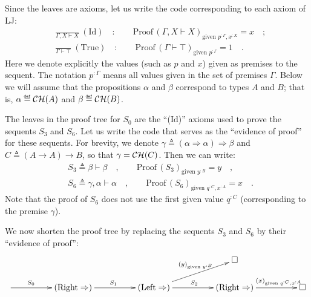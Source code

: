 Since the leaves are axioms, let us write the code corresponding to
each axiom of LJ:
\begin{align*}
 & \frac{}{\Gamma,X\vdash X}~(\text{Id})\quad:\quad\quad\text{Proof}\,(\Gamma,X\vdash X)_{\text{given }p^{:\Gamma},x^{:X}}=x\quad;\\
 & \frac{}{\Gamma\vdash\top}~(\text{True})\quad:\quad\quad\text{Proof}\,(\Gamma\vdash\top)_{\text{given }p^{:\Gamma}}=1\quad.
\end{align*}
Here we denote explicitly the values (such as $p$ and $x$) given
as premises to the sequent. The notation $p^{:\Gamma}$ means all
values given in the set of premises $\Gamma$. Below we will assume
that the propositions $\alpha$ and $\beta$ correspond to types $A$
and $B$; that is, $\alpha\triangleq{\cal CH}(A)$ and $\beta\triangleq{\cal CH}(B)$.

The leaves in the proof tree for $S_{0}$ are the \textsf{``}($\text{Id}$)\textsf{''}
axioms used to prove the sequents $S_{3}$ and $S_{6}$. Let us write
the code that serves as the \textsf{``}evidence of proof\textsf{''} for these sequents.
For brevity, we denote $\gamma\triangleq\left(\alpha\Rightarrow\alpha\right)\Rightarrow\beta$
and $C\triangleq\left(A\rightarrow A\right)\rightarrow B$, so that
$\gamma={\cal CH}(C)$. Then we can write:
\begin{align*}
 & S_{3}\triangleq\beta\vdash\beta\quad,\quad\quad\text{Proof}\,(S_{3})_{\text{given }y^{:B}}=y\quad,\\
 & S_{6}\triangleq\gamma,\alpha\vdash\alpha\quad,\quad\quad\text{Proof}\,(S_{6})_{\text{given }q^{:C},x^{:A}}=x\quad.
\end{align*}
Note that the proof of $S_{6}$ does not use the first given value
$q^{:C}$ (corresponding to the premise $\gamma$).

We now shorten the proof tree by replacing the sequents $S_{3}$ and
$S_{6}$ by their \textsf{``}evidence of proof\textsf{''}:
\[
\xymatrix{\xyScaleY{1.5pc}\xyScaleX{4pc} &  &  & \square\\
\ar[r]\sp(0.35){S_{0}} & (\text{Right}\Rightarrow)\ar[r]\sp(0.5){S_{1}} & (\text{Left}\Rightarrow)\ar[r]\sp(0.5){S_{2}}\ar[ru]\sp(0.6){(y)_{\text{given }y^{:B}}} & (\text{Right}\Rightarrow)\ar[r]\sp(0.65){(x)_{\text{given }q^{:C},x^{:A}}} & \square
}
\]

